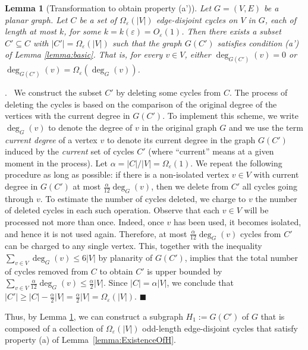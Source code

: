 \documentclass[11pt]{article}
\newenvironment{proof}{\noindent {\bf Proof}.\ }{\qed \par\vskip 4mm\par}
\newtheorem{lemma}[theorem]{Lemma}
\newcommand{\sq}{\hbox{\rlap{$\sqcap$}$\sqcup$}}
\newcommand{\qed}{\hspace*{\fill}\sq}
\renewcommand{\qed}{\hspace*{\fill}\ensuremath{\blacksquare}}
\newcommand{\eps}{\ensuremath{\epsilon}}
\def\epsilon{\ensuremath{\varepsilon}}
\begin{document}
\begin{lemma}[Transformation to obtain property (a')]
\label{lemma:transformation}
Let $G=(V,E)$ be a planar graph. Let $C$ be a set of $\Omega_\eps(|V|)$ edge-disjoint cycles on $V$ in $G$, each of length at most $k$, for some
$k = k(\eps) = O_{\eps}(1)$. Then there exists a subset $C' \subseteq C$ with $|C'| = \Omega_{\eps}(|V|)$ such that the graph $G(C')$ satisfies
condition (a') of Lemma \ref{lemma:basic}. That is, for every $v \in V$, either $\deg_{G(C')}(v) = 0$ or $\deg_{G{(C')}}(v) = \Omega_\eps(\deg_G(v))$.
\end{lemma}

\begin{proof}
We construct the subset $C'$ by deleting some cycles from $C$. The process of deleting the cycles is based on the comparison of the original degree of the vertices with the current degree in $G(C')$. To implement this scheme, we write $\deg_G(v)$ to denote the degree of $v$ in the original graph $G$ and we use the term \emph{current degree} of a vertex $v$ to denote its current degree in the graph $G(C')$ induced by the \emph{current} set of cycles $C'$ (where ``current'' means at a given moment in the process). Let $\alpha = |C| / |V| = \Omega_\eps(1)$. We repeat the following procedure as long as possible: if there is a non-isolated vertex $v \in V$ with current degree in $G(C')$ at most $\frac{\alpha}{12} \deg_G(v)$, then we delete from $C'$ all cycles going through $v$. To estimate the number of cycles deleted, we charge to $v$ the number of deleted cycles in each such operation. Observe that each $v \in V$ will be processed not more than once. Indeed, once $v$ has been used, it becomes isolated, and hence it is not used again. Therefore, at most $\frac{\alpha}{12} \deg_G(v)$ cycles from $C'$ can be charged to any single vertex. This, together with the inequality $\sum_{v \in V} \deg_G(v) \le 6 |V|$ by planarity of $G(C')$, implies that the total number of cycles removed from $C$  to obtain $C'$ is upper bounded by $\sum_{v \in V} \frac{\alpha}{12} \deg_G(v) \le \frac{\alpha}{2} |V|$. Since $|C| = \alpha |V|$, we conclude that $|C'| \ge |C| - \frac{\alpha}{2} |V| = \frac{\alpha}{2} |V| = \Omega_{\eps}(|V|)$.
\end{proof}

Thus, by Lemma \ref{lemma:transformation}, we can construct a subgraph $H_1:=G(C')$ of $G$ that is composed of a collection of $\Omega_{\eps}(|V|)$ odd-length edge-disjoint cycles that satisfy property (a) of Lemma~\ref{lemma:ExistenceOfH}.
\end{document}
